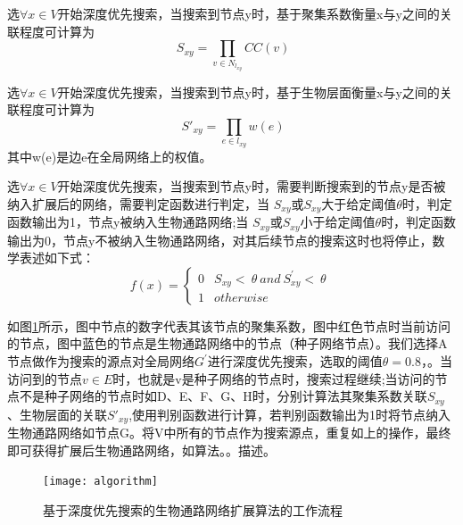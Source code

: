 选$\forall x\in V$开始深度优先搜索，当搜索到节点y时，基于聚集系数衡量x与y之间的关联程度可计算为 
 \begin{equation}
\ S_{xy} =\prod _{v\in N_{l_{xy}}} CC( v)
 \end{equation}

选$\forall x\in V$开始深度优先搜索，当搜索到节点y时，基于生物层面衡量x与y之间的关联程度可计算为 
 \begin{equation}
\ S'_{xy} =\prod _{e\in l_{xy}} w( e)
 \end{equation}
其中w(e)是边e在全局网络上的权值。

选$\forall x\in V$开始深度优先搜索，当搜索到节点y时，需要判断搜索到的节点y是否被纳入扩展后的网络，需要判定函数进行判定，当 $S_{xy}$或$S_{xy}$大于给定阈值$\theta$时，判定函数输出为1，节点y被纳入生物通路网络;当 $S_{xy}$或$S_{xy}$小于给定阈值$\theta$时，判定函数输出为0，节点y不被纳入生物通路网络，对其后续节点的搜索这时也将停止，数学表述如下式：
\begin{equation}
f( x) =\begin{cases}
0 & S_{xy} < \ \theta \ and\ S^{'}_{xy} < \ \theta \ \\
1 & otherwise
\end{cases}
\end{equation}

如图\ref{algorithm}所示，图中节点的数字代表其该节点的聚集系数，图中红色节点时当前访问的节点，图中蓝色的节点是生物通路网络中的节点（种子网络节点）。我们选择A节点做作为搜索的源点对全局网络$G^{'}$进行深度优先搜索，选取的阈值$\theta=0.8$，。当访问到的节点$v\in E$时，也就是v是种子网络的节点时，搜索过程继续;当访问的节点不是种子网络的节点时如D、E、F、G、H时，分别计算法其聚集系数关联$S_{xy}$、生物层面的关联$S'_{xy}$,使用判别函数进行计算，若判别函数输出为1时将节点纳入生物通路网络如节点G。将V中所有的节点作为搜索源点，重复如上的操作，最终即可获得扩展后生物通路网络，如算法。。描述。
\begin{figure}[h]
\centering
\texttt{[image: algorithm]}
\caption[algorithm]{基于深度优先搜索的生物通路网络扩展算法的工作流程}
\label{algorithm}
\end{figure}

\begin{algorithm}
%


\end{algorithm}


